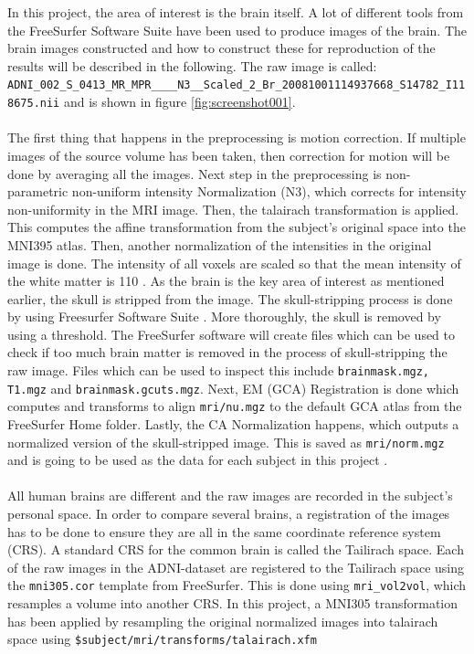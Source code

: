 \documentclass[12pt, fleqn, titlepage]{article}
\newcommand{\1}[1]{\mathds{1}\left[#1\right]}
\begin{document}
In this project, the area of interest is the brain itself. A lot of different tools from the FreeSurfer Software Suite have been used to produce images of the brain. The brain images constructed and how to construct these for reproduction of the results will be described in the following. The raw image is called: \newline \texttt{
ADNI\_002\_S\_0413\_MR\_MPR\_\_\_\_N3\_\_Scaled\_2\_Br\_20081001114937668\_S14782\_I118675.nii} and is shown in figure \ref{fig:screenshot001}. 
\\\\
The first thing that happens in the preprocessing is motion correction. If multiple images of the source volume has been taken, then correction for motion will be done by averaging all the images.
Next step in the preprocessing is non-parametric non-uniform intensity Normalization (N3), which corrects for intensity non-uniformity in the MRI image.
Then, the talairach transformation is applied. This computes the affine transformation from the subject's original space into the MNI395 atlas.
Then, another normalization of the intensities in the original image is done. The intensity of all voxels are scaled so that the mean intensity of the white matter is 110 \cite{normalize}. 
As the brain is the key area of interest as mentioned earlier, the skull is stripped from the image. The skull-stripping process is done by using Freesurfer Software Suite \cite{freesurfer}.
More thoroughly, the skull is removed by using a threshold.
The FreeSurfer software will create files which can be used to check if too much brain matter is removed in the process of skull-stripping the raw image.
Files which can be used to inspect this include \texttt{brainmask.mgz, T1.mgz} and \texttt{brainmask.gcuts.mgz}.
Next, EM (GCA) Registration is done which computes and transforms to align
\texttt{mri/nu.mgz} to the default GCA atlas from the FreeSurfer Home folder. Lastly, the CA Normalization happens, which outputs a normalized version of the skull-stripped image. This is saved as \texttt{mri/norm.mgz} and is going to be used as the data for each subject in this project \cite{reckon}.
\\\\
All human brains are different and the raw images are recorded in the subject's personal space. 
In order to compare several brains, a registration of the images has to be done to ensure they are all in the same coordinate reference system (CRS). 
A standard CRS for the common brain is called the Tailirach space. 
Each of the raw images in the ADNI-dataset are registered to the Tailirach space using the \texttt{mni305.cor} template from FreeSurfer. 
This is done using \texttt{mri\_vol2vol}, which resamples a volume into another CRS. 
In this project, a MNI305 transformation has been applied by resampling the original normalized images into talairach space using \texttt{\$subject/mri/transforms/talairach.xfm} 
\end{document}

